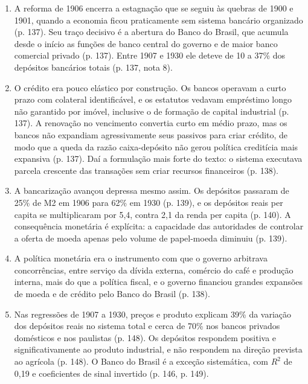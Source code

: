 \begin{enumerate}[leftmargin=*,nosep]
\item A reforma de 1906 encerra a estagnação que se seguiu às quebras de 1900 e 1901, quando a economia ficou praticamente sem sistema bancário organizado (p. 137). Seu traço decisivo é a abertura do Banco do Brasil, que acumula desde o início as funções de banco central do governo e de maior banco comercial privado (p. 137). Entre 1907 e 1930 ele deteve de 10 a 37\% dos depósitos bancários totais (p. 137, nota 8).

\item O crédito era pouco elástico por construção. Os bancos operavam a curto prazo com colateral identificável, e os estatutos vedavam empréstimo longo não garantido por imóvel, inclusive o de formação de capital industrial (p. 137). A renovação no vencimento convertia curto em médio prazo, mas os bancos não expandiam agressivamente seus passivos para criar crédito, de modo que a queda da razão caixa-depósito não gerou política creditícia mais expansiva (p. 137). Daí a formulação mais forte do texto: o sistema executava parcela crescente das transações sem criar recursos financeiros (p. 138).

\item A bancarização avançou depressa mesmo assim. Os depósitos passaram de 25\% de M2 em 1906 para 62\% em 1930 (p. 139), e os depósitos reais per capita se multiplicaram por 5,4, contra 2,1 da renda per capita (p. 140). A consequência monetária é explícita: a capacidade das autoridades de controlar a oferta de moeda apenas pelo volume de papel-moeda diminuiu (p. 139).

\item A política monetária era o instrumento com que o governo arbitrava concorrências, entre serviço da dívida externa, comércio do café e produção interna, mais do que a política fiscal, e o governo financiou grandes expansões de moeda e de crédito pelo Banco do Brasil (p. 138).

\item Nas regressões de 1907 a 1930, preços e produto explicam 39\% da variação dos depósitos reais no sistema total e cerca de 70\% nos bancos privados domésticos e nos paulistas (p. 148). Os depósitos respondem positiva e significativamente ao produto industrial, e não respondem na direção prevista ao agrícola (p. 148). O Banco do Brasil é a exceção sistemática, com $R^2$ de 0,19 e coeficientes de sinal invertido (p. 146, p. 149).
\end{enumerate}

